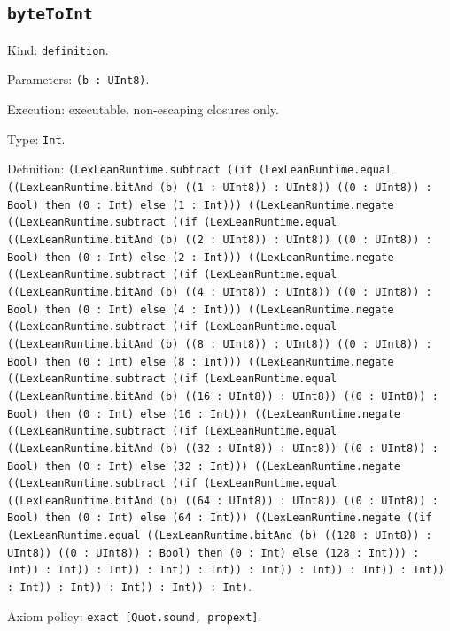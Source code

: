 \documentclass[11pt]{article}
\begin{document}
\subsection*{\texttt{byteToInt}}
\noindent Kind: \texttt{definition}.\par
\noindent Parameters: \texttt{(b : UInt8)}.\par
\noindent Execution: executable, non-escaping closures only.\par
\noindent Type: \texttt{Int}.\par
\noindent Definition: \texttt{(LexLeanRuntime.subtract ((if (LexLeanRuntime.equal ((LexLeanRuntime.bitAnd (b) ((1 : UInt8)) : UInt8)) ((0 : UInt8)) : Bool) then (0 : Int) else (1 : Int))) ((LexLeanRuntime.negate ((LexLeanRuntime.subtract ((if (LexLeanRuntime.equal ((LexLeanRuntime.bitAnd (b) ((2 : UInt8)) : UInt8)) ((0 : UInt8)) : Bool) then (0 : Int) else (2 : Int))) ((LexLeanRuntime.negate ((LexLeanRuntime.subtract ((if (LexLeanRuntime.equal ((LexLeanRuntime.bitAnd (b) ((4 : UInt8)) : UInt8)) ((0 : UInt8)) : Bool) then (0 : Int) else (4 : Int))) ((LexLeanRuntime.negate ((LexLeanRuntime.subtract ((if (LexLeanRuntime.equal ((LexLeanRuntime.bitAnd (b) ((8 : UInt8)) : UInt8)) ((0 : UInt8)) : Bool) then (0 : Int) else (8 : Int))) ((LexLeanRuntime.negate ((LexLeanRuntime.subtract ((if (LexLeanRuntime.equal ((LexLeanRuntime.bitAnd (b) ((16 : UInt8)) : UInt8)) ((0 : UInt8)) : Bool) then (0 : Int) else (16 : Int))) ((LexLeanRuntime.negate ((LexLeanRuntime.subtract ((if (LexLeanRuntime.equal ((LexLeanRuntime.bitAnd (b) ((32 : UInt8)) : UInt8)) ((0 : UInt8)) : Bool) then (0 : Int) else (32 : Int))) ((LexLeanRuntime.negate ((LexLeanRuntime.subtract ((if (LexLeanRuntime.equal ((LexLeanRuntime.bitAnd (b) ((64 : UInt8)) : UInt8)) ((0 : UInt8)) : Bool) then (0 : Int) else (64 : Int))) ((LexLeanRuntime.negate ((if (LexLeanRuntime.equal ((LexLeanRuntime.bitAnd (b) ((128 : UInt8)) : UInt8)) ((0 : UInt8)) : Bool) then (0 : Int) else (128 : Int))) : Int)) : Int)) : Int)) : Int)) : Int)) : Int)) : Int)) : Int)) : Int)) : Int)) : Int)) : Int)) : Int)) : Int)}.\par
\noindent Axiom policy: \texttt{exact [Quot.sound, propext]}.\par
\end{document}
